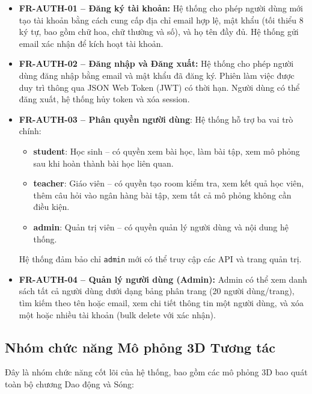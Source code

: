 \begin{itemize}
    \item \textbf{FR-AUTH-01 – Đăng ký tài khoản:} Hệ thống cho phép người dùng mới tạo tài khoản bằng cách cung cấp địa chỉ email hợp lệ, mật khẩu (tối thiểu 8 ký tự, bao gồm chữ hoa, chữ thường và số), và họ tên đầy đủ. Hệ thống gửi email xác nhận để kích hoạt tài khoản.
    
    \item \textbf{FR-AUTH-02 – Đăng nhập và Đăng xuất:} Hệ thống cho phép người dùng đăng nhập bằng email và mật khẩu đã đăng ký. Phiên làm việc được duy trì thông qua JSON Web Token (JWT) có thời hạn. Người dùng có thể đăng xuất, hệ thống hủy token và xóa session.
    
    \item \textbf{FR-AUTH-03 – Phân quyền người dùng}: Hệ thống hỗ trợ ba vai trò chính:
    \begin{itemize}
        \item \textbf{student}: Học sinh – có quyền xem bài học, làm bài tập, xem mô phỏng sau khi hoàn thành bài học liên quan.
        \item \textbf{teacher}: Giáo viên – có quyền tạo room kiểm tra, xem kết quả học viên, thêm câu hỏi vào ngân hàng bài tập, xem tất cả mô phỏng không cần điều kiện.
        \item \textbf{admin}: Quản trị viên – có quyền quản lý người dùng và nội dung hệ thống.
    \end{itemize}
    Hệ thống đảm bảo chỉ \texttt{admin} mới có thể truy cập các API và trang quản trị.
    
    \item \textbf{FR-AUTH-04 – Quản lý người dùng (Admin):} Admin có thể xem danh sách tất cả người dùng dưới dạng bảng phân trang (20 người dùng/trang), tìm kiếm theo tên hoặc email, xem chi tiết thông tin một người dùng, và xóa một hoặc nhiều tài khoản (bulk delete với xác nhận).
\end{itemize}

\subsection{Nhóm chức năng Mô phỏng 3D Tương tác}

Đây là nhóm chức năng cốt lõi của hệ thống, bao gồm các mô phỏng 3D bao quát toàn bộ chương Dao động và Sóng:

